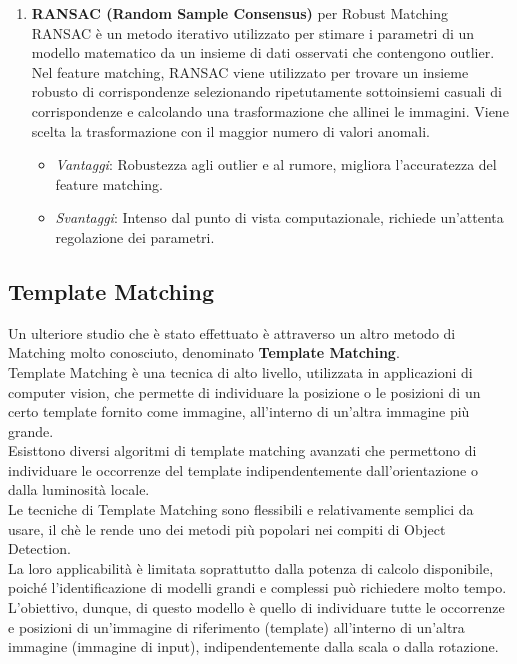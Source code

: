 \documentclass[12pt,a4paper,openright,twoside]{book}
\begin{document}
\begin{enumerate}
\item \textbf{ RANSAC (Random Sample Consensus)} per Robust Matching\\
RANSAC è un metodo iterativo utilizzato per stimare i parametri di un modello matematico da un insieme di dati osservati che contengono outlier. Nel feature matching, RANSAC viene utilizzato per trovare un insieme robusto di corrispondenze selezionando ripetutamente sottoinsiemi casuali di corrispondenze e calcolando una trasformazione che allinei le immagini. Viene scelta la trasformazione con il maggior numero di valori anomali.

\begin{itemize}
\item {\itshape Vantaggi}: Robustezza agli outlier e al rumore, migliora l'accuratezza del feature matching.
\item {\itshape Svantaggi}:  Intenso dal punto di vista computazionale, richiede un'attenta regolazione dei parametri.
\end{itemize}

\end{enumerate}

\subsection{Template Matching}
Un ulteriore studio che è stato effettuato è attraverso un altro metodo di Matching molto conosciuto, denominato \textbf{Template Matching}.\\
Template Matching è una tecnica di alto livello, utilizzata in applicazioni di computer vision, che permette di individuare la posizione o le posizioni di un certo template fornito come immagine, all'interno di un'altra immagine più grande.\\
Esisttono diversi algoritmi di template matching avanzati che permettono di individuare le occorrenze del template indipendentemente dall'orientazione o dalla luminosità locale.\\
Le tecniche di Template Matching sono flessibili e relativamente semplici da usare, il chè le rende uno dei metodi più popolari nei compiti di Object Detection.\\
La loro applicabilità è limitata soprattutto dalla potenza di calcolo disponibile, poiché l'identificazione di modelli grandi e complessi può richiedere molto tempo.\\
L'obiettivo, dunque, di questo modello è quello di individuare tutte le occorrenze e posizioni di un'immagine di riferimento (template) all'interno di un'altra immagine (immagine di input), indipendentemente dalla scala o dalla rotazione.\\
\end{document}
